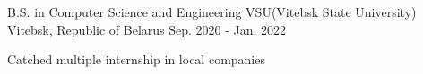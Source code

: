 


\begin{cventries}

\cventry
{B.S. in Computer Science and Engineering} %
{VSU(Vitebsk State University)} %
{Vitebsk, Republic of Belarus} %
{Sep. 2020 - Jan. 2022} %
{ %
\begin{cvitems}
\item {Catched multiple internship in local companies}
\end{cvitems}
}
\end{cventries}


